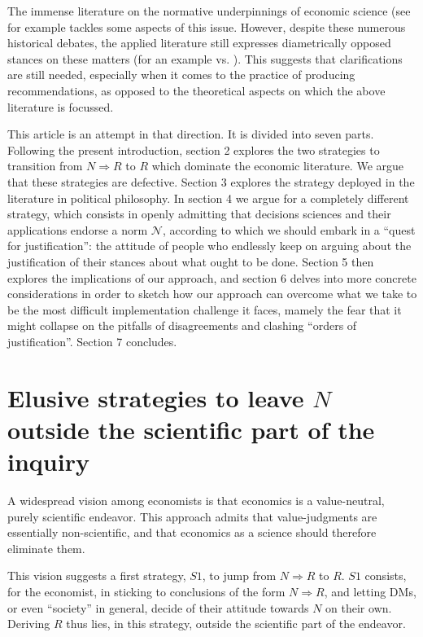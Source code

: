 \documentclass[preprint, french, english, 11pt, authoryear]{elsarticle}%
\newcommand{\adv}{\mathscr{N}}
\begin{document}
The immense literature on the normative underpinnings of economic science (see for example \citep{buchanan_positive_1959,sen_nature_1967,dwyer_scientific_1985, heath_value_1994,mongin_value_2006} tackles some aspects of this issue. However, despite these numerous historical debates, the applied literature still expresses diametrically opposed stances on these matters (for an example \cite{spash_bulldozing_2015} vs. \cite{scharks_dont_2016}). This suggests that clarifications are still needed, especially when it comes to the practice of producing recommendations, as opposed to the theoretical aspects on which the above literature is focussed.

This article is an attempt in that direction. It is divided into seven parts. Following the present introduction, section 2 explores the two strategies to transition from $N ⇒ R$ to $R$ which dominate the economic literature. We argue that these strategies are defective. Section 3 explores the strategy deployed in the literature in political philosophy. In section 4 we argue for a completely different strategy, which consists in openly admitting that decisions sciences and their applications endorse a norm $\adv$, according to which we should embark in a ``quest for justification'': the attitude of people who endlessly keep on arguing about the justification of their stances about what ought to be done. Section 5 then explores the implications of our approach, and section 6 delves into more concrete considerations in order to sketch how our approach can overcome what we take to be the most difficult implementation challenge it faces, mamely the fear that it might collapse on the pitfalls of disagreements and clashing ``orders of justification''. Section 7 concludes.

\section{\texorpdfstring{Elusive strategies to leave $N$ outside the scientific part of the inquiry}{Elusive strategies to leave N outside the scientific part of the inquiry}}
A widespread vision among economists is that economics is a value-neutral, purely scientific endeavor. This approach admits that value-judgments are essentially non-scientific, and that economics as a science should therefore eliminate them.

This vision suggests a first strategy, $S1$, to jump from $N ⇒ R$ to $R$. $S1$ consists, for the economist, in sticking to conclusions of the form $N ⇒ R$, and letting \acp{DM}, or even “society” in general, decide of their attitude towards $N$ on their own. Deriving $R$ thus lies, in this strategy, outside the scientific part of the endeavor.
\end{document}
